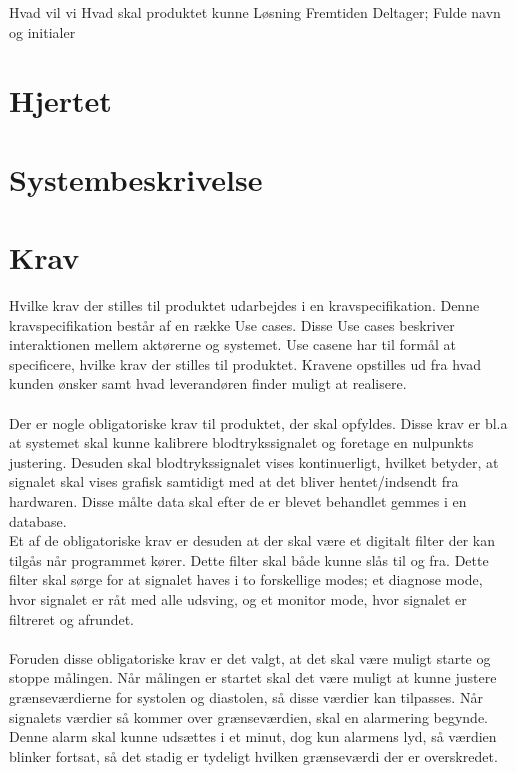Hvad vil vi
Hvad skal produktet kunne
Løsning
Fremtiden
Deltager; Fulde navn og initialer


\chapter{Hjertet}



\chapter{Systembeskrivelse}



\chapter{Krav}
Hvilke krav der stilles til produktet udarbejdes i en kravspecifikation. Denne kravspecifikation består af en række Use cases. Disse Use cases beskriver interaktionen mellem aktørerne og systemet. Use casene har til formål at specificere, hvilke krav der stilles til produktet. Kravene opstilles ud fra hvad kunden ønsker samt hvad leverandøren finder muligt at realisere. \\ \\
Der er nogle obligatoriske krav til produktet, der skal opfyldes. Disse krav er bl.a at systemet skal kunne kalibrere blodtrykssignalet og foretage en nulpunkts justering. Desuden skal blodtrykssignalet vises kontinuerligt, hvilket betyder, at signalet skal vises grafisk samtidigt med at det bliver hentet/indsendt fra hardwaren. Disse målte data skal efter de er blevet behandlet gemmes i en database.\\
Et af de obligatoriske krav er desuden at der skal være et digitalt filter der kan tilgås når programmet kører. Dette filter skal både kunne slås til og fra. Dette filter skal sørge for at signalet haves i to forskellige modes; et diagnose mode, hvor signalet er råt med alle udsving, og et monitor mode, hvor signalet er filtreret og afrundet.\\\\
Foruden disse obligatoriske krav er det valgt, at det skal være muligt starte og stoppe målingen. Når målingen er startet skal det være muligt at kunne justere grænseværdierne for systolen og diastolen, så disse værdier kan tilpasses. Når signalets værdier så kommer over grænseværdien, skal en alarmering begynde. Denne alarm skal kunne udsættes i et minut, dog kun alarmens lyd, så værdien blinker fortsat, så det stadig er tydeligt hvilken grænseværdi der er overskredet.\\
